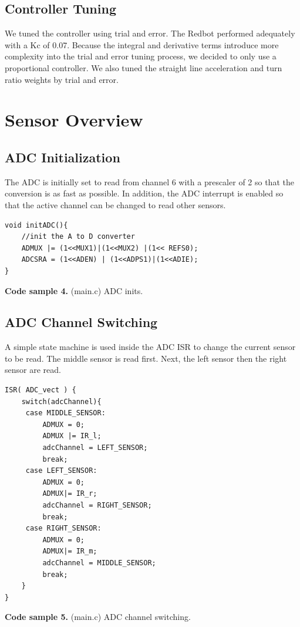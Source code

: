 \documentclass{article}
\begin{document}
\subsection{Controller Tuning}
We tuned the controller using trial and error. The Redbot performed adequately with a Kc of 0.07. Because the integral and derivative terms introduce more complexity into the trial and error tuning process, we decided to only use a proportional controller. We also tuned the straight line acceleration and turn ratio weights by trial and error. 


\section{Sensor Overview}
\subsection{ADC Initialization}
The ADC is initially set to read from channel 6 with a prescaler of 2 so that the conversion is as fast as possible.  In addition, the ADC interrupt is enabled so that the active channel can be changed to read other sensors.
\begin{lstlisting}
void initADC(){
    //init the A to D converter
    ADMUX |= (1<<MUX1)|(1<<MUX2) |(1<< REFS0);
    ADCSRA = (1<<ADEN) | (1<<ADPS1)|(1<<ADIE);
}
\end{lstlisting}
\textbf{Code sample 4.} (main.c) ADC inits.

\subsection{ADC Channel Switching}
A simple state machine is used inside the ADC ISR to change the current sensor to be read.  The middle sensor is read first.  Next, the left sensor then the right sensor are read.

\begin{lstlisting}
ISR( ADC_vect ) {
    switch(adcChannel){
   	 case MIDDLE_SENSOR:
   		 ADMUX = 0;
   		 ADMUX |= IR_l;
   		 adcChannel = LEFT_SENSOR;
   		 break;
   	 case LEFT_SENSOR:
   		 ADMUX = 0;
   		 ADMUX|= IR_r;
   		 adcChannel = RIGHT_SENSOR;
   		 break;
   	 case RIGHT_SENSOR:
   		 ADMUX = 0;
   		 ADMUX|= IR_m;
   		 adcChannel = MIDDLE_SENSOR;
   		 break;
    }
}
\end{lstlisting}
\textbf{Code sample 5.} (main.c) ADC channel switching.
\end{document}
